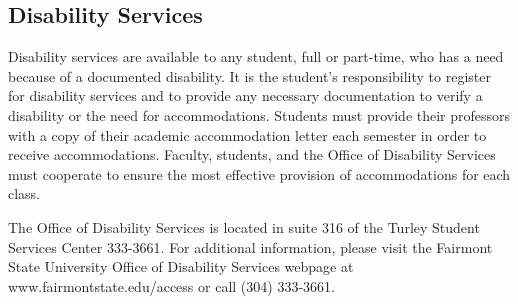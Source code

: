 \documentclass{tufte-handout}
\begin{document}
\subsection{Disability Services}

Disability services are available to any student, full or part-time, who has a need because of a documented disability. It is the student's responsibility to register for disability services and to provide any necessary documentation to verify a disability or the need for accommodations. Students must provide their professors with a copy of their academic accommodation letter each semester in order to receive accommodations. Faculty, students, and the Office of Disability Services must cooperate to ensure the most effective provision of accommodations for each class.

The Office of Disability Services is located in suite 316 of the Turley Student Services Center 333-3661. For additional information, please visit the Fairmont State University Office of Disability Services webpage at www.fairmontstate.edu/access or call (304) 333-3661.
\end{document}
